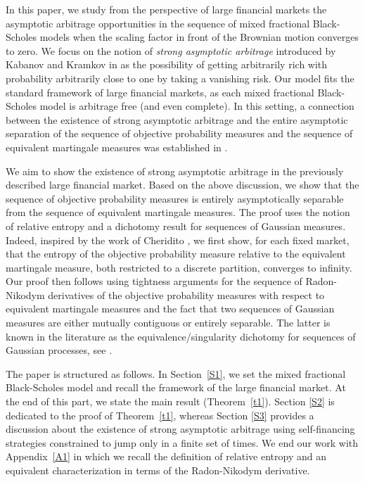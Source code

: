 \documentclass[reqno,a4paper]{amsart}
\theoremstyle{plain}
\theoremstyle{definition}
\theoremstyle{plain}
\theoremstyle{plain}
\theoremstyle{plain}
\begin{document}
In this paper, we study from the perspective of large financial markets the asymptotic arbitrage opportunities in the sequence of mixed fractional Black-Scholes models when the scaling factor in front of the Brownian motion converges to zero. We focus on the notion of \textit{strong asymptotic arbitrage} introduced by Kabanov and Kramkov in \cite{Kakra} as the possibility of getting arbitrarily rich with probability arbitrarily close to one by taking a vanishing risk. Our model fits the standard framework of large financial markets, as each mixed fractional Black-Scholes model is arbitrage free (and even complete). In this setting, a connection between the existence of strong asymptotic arbitrage and the entire asymptotic separation of the sequence of objective probability measures and the sequence of equivalent martingale measures was established in \cite{Kakra}.

We aim to show the existence of strong asymptotic arbitrage in the previously described large financial market. Based on the above discussion, we show that the sequence of objective probability measures is entirely asymptotically separable from the sequence of equivalent martingale measures. The proof uses the notion of relative entropy and a dichotomy result for sequences of Gaussian measures. Indeed, inspired by the work of Cheridito \cite{Ch,Ch1}, we first show, for each fixed market, that the entropy of the objective probability measure relative to the equivalent martingale measure, both restricted to a discrete partition, converges to infinity. Our proof then follows using tightness arguments for the sequence of Radon-Nikodym derivatives of the objective probability measures with respect to equivalent martingale measures and the fact that two sequences of Gaussian measures are either mutually contiguous or entirely separable. The latter is known in the literature as the equivalence/singularity dichotomy for sequences of Gaussian processes, see \cite{Eag81}.

The paper is structured as follows. In Section~\ref{S1}, we set the mixed fractional Black-Scholes model and recall the framework of the large financial market. At the end of this part, we state the main result (Theorem~\ref{t1}). Section \ref{S2} is dedicated to the proof of Theorem~\ref{t1}, whereas Section \ref{S3} provides a discussion about the existence of strong asymptotic arbitrage using self-financing strategies constrained to jump only in a finite set of times. We end our work with Appendix~\ref{A1} in which we recall the definition of relative entropy and an equivalent characterization in terms of the Radon-Nikodym derivative.
\end{document}
